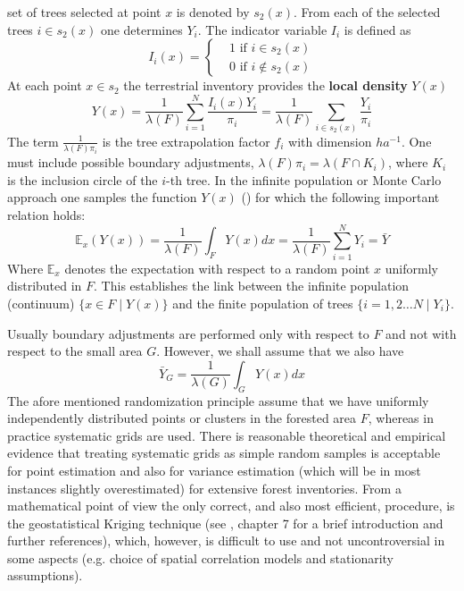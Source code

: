 \documentclass[a4paper,12pt,leqno, titlepage]{article}
\newcommand{\EX}{\mathbb{E}}
\begin{document}
set of trees selected at point $x$ is denoted by $s_{2}(x)$. From each of the
selected trees $i\in{s_{2}(x)}$ one determines $Y_i$. The indicator variable $I_i$ is defined as
\begin{equation}\label{1stage}
 I_i(x)=\begin{cases}&1 \text{ if $i\in s_{2}(x)$}\\
                      &0 \text{ if $i\not\in s_{2}(x)$}
         \end{cases}
\end{equation}
At each point $x\in{s_2}$ the
terrestrial inventory provides the \textbf{local density} $Y(x)$
\begin{equation}\label{truelocaldensity}
 Y(x) =\frac{1}{\lambda(F)}\sum_{i=1}^N \frac{I_i(x)Y_i}{\pi_i}=\frac{1}{\lambda(F)}\sum_{i\in{s}_2(x)} \frac{Y_i}{\pi_i}
 \end{equation}
 The term $\frac{1}{\lambda(F)\pi_i}$ is the tree extrapolation factor $f_i$ with dimension $ha^{-1}$. One must include possible boundary adjustments, $\lambda(F)\pi_i=\lambda(F \cap K_i)$, where $K_i$ is the inclusion circle of the $i$-th tree. In the infinite population or Monte Carlo approach one samples the function $Y(x)$ (\cite{mandallaz}) for which the following important relation holds:
 \begin{equation}\label{montecarlo}
 \EX_{x} (Y(x))=\frac{1}{\lambda(F)}\int_{F} Y(x)dx=\frac{1}{\lambda(F)}\sum_{i=1}^NY_i=\bar{Y}
 \end{equation}
 Where $\EX_x$ denotes the expectation with respect to a random point $x$ uniformly distributed in $F$. This establishes the link between the infinite population (continuum) $\{x\in{F} \mid Y(x)\}$ and the finite population of trees $\{i=1,2 \ldots N \mid Y_i\}$.\par
 Usually boundary adjustments are performed only with respect to $F$ and not with respect to the small area $G$. However, we shall assume that we also have
 \begin{equation}\label{small2}
 \bar{Y}_G=\frac{1}{\lambda(G)}\int_{G} Y(x)dx
 \end{equation}
 The afore mentioned randomization principle assume that we have uniformly independently distributed points or clusters in the forested area $F$, whereas in practice systematic grids are used. There is reasonable theoretical and empirical evidence that treating systematic grids as simple random samples is acceptable for point estimation and also for variance estimation (which will be in most instances slightly overestimated) for extensive forest inventories. From a mathematical point of view the only correct, and also most efficient, procedure, is the geostatistical Kriging technique (see \cite{mandallaz}, chapter 7 for a brief introduction and further references), which, however, is difficult to use and not uncontroversial in some aspects (e.g. choice of spatial correlation models and stationarity assumptions).
\end{document}
